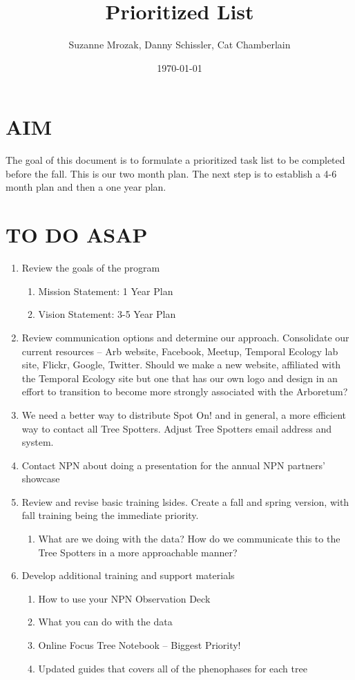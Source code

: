 \documentclass{article}\usepackage[]{graphicx}\usepackage[]{color}
\begin{document}
\renewcommand{\thetable}{\arabic{table}}
\renewcommand{\thefigure}{\arabic{figure}}
\renewcommand{\labelitemi}{$-$}
\title{Prioritized List}
\author{Suzanne Mrozak, Danny Schissler, Cat Chamberlain}
\date{\today}
\maketitle
\section*{AIM}
The goal of this document is to formulate a prioritized task list to be completed before the fall. This is our two month plan. The next step is to establish a 4-6 month plan and then a one year plan. 
\section*{TO DO ASAP}
\begin{enumerate}
\item Review the goals of the program
\begin{enumerate}
  \item Mission Statement: 1 Year Plan
  \item Vision Statement: 3-5 Year Plan
\end{enumerate}
\item Review communication options and determine our approach. Consolidate our current resources -- Arb website, Facebook, Meetup, Temporal Ecology lab site, Flickr, Google, Twitter. Should we make a new website, affiliated with the Temporal Ecology site but one that has our own logo and design in an effort to transition to become more strongly associated with the Arboretum?
\item We need a better way to distribute Spot On! and in general, a more efficient way to contact all Tree Spotters. Adjust Tree Spotters email address and system. 
\item Contact NPN about doing a presentation for the annual NPN partners' showcase
\item Review and revise basic training lsides. Create a fall and spring version, with fall training being the immediate priority. 
\begin{enumerate}
  \item What are we doing with the data? How do we communicate this to the Tree Spotters in a more approachable manner?
\end{enumerate}
\item Develop additional training and support materials
\begin{enumerate}
  \item How to use your NPN Observation Deck
  \item What you can do with the data
  \item Online Focus Tree Notebook -- Biggest Priority! 
  \item Updated guides that covers all of the phenophases for each tree 
\end{enumerate}
\end{enumerate}
\end{document}
